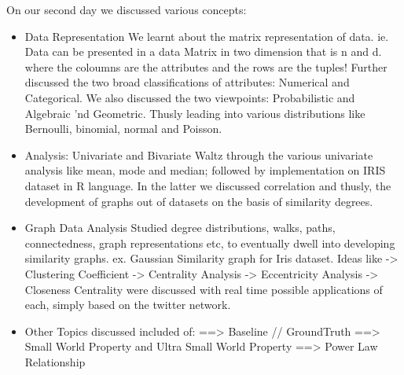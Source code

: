 \documentclass[a4paper]{article}
\begin{document}
On our second day we discussed various concepts: \newline
	
\begin{itemize}
\item Data Representation\newline
 		We learnt about the matrix representation of data. ie. Data can be presented in a data Matrix in two dimension that is n and d. where the coloumns are the attributes and the rows are the tuples! Further discussed the two broad classifications of attributes: Numerical and Categorical. We also discussed the two viewpoints: Probabilistic and Algebraic 'nd Geometric.\newline
        Thusly leading into various distributions like Bernoulli, binomial, normal and Poisson. 
\item 	Analysis: Univariate and Bivariate\newline
		Waltz through the various univariate analysis like mean, mode and median; followed by implementation on IRIS dataset in R language.\newline
        In the latter we discussed correlation and thusly, the development of graphs out of datasets on the basis of similarity degrees.
\item 	Graph Data Analysis\newline
 		Studied degree distributions, walks, paths, connectedness, graph representations etc, to eventually dwell into developing similarity graphs. ex. Gaussian Similarity graph for Iris dataset.\newline
        Ideas like \newline 
        -> Clustering Coefficient\newline
        -> Centrality Analysis \newline
		-> Eccentricity Analysis \newline
		-> Closeness Centrality\newline
       were discussed with real time possible applications of each, simply based on the twitter network.
        
\item 	Other Topics discussed included of:\newline
		==> Baseline // GroundTruth \newline
        ==> Small World Property and Ultra Small World Property\newline
        ==> Power Law Relationship
\end{itemize}
\end{document}
